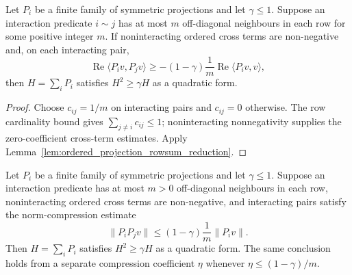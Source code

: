 \begin{lemma}
    \label{lem:finite_overlap_projection_rowsum_reduction}
    \leanok
    Let $P_i$ be a finite family of symmetric projections and let $\gamma\le1$.
    Suppose an interaction predicate $i\sim j$ has at most $m$ off-diagonal
    neighbours in each row for some positive integer $m$. If noninteracting
    ordered cross terms are non-negative and, on each interacting pair,
    \[
        \operatorname{Re}\langle P_i v,P_jv\rangle
        \ge -(1-\gamma)\frac{1}{m}\operatorname{Re}\langle P_i v,v\rangle,
    \]
    then $H=\sum_i P_i$ satisfies $H^2\ge \gamma H$ as a quadratic form.
\end{lemma}

\begin{proof}
    \leanok
    Choose $c_{ij}=1/m$ on interacting pairs and $c_{ij}=0$ otherwise. The row
    cardinality bound gives $\sum_{j\ne i}c_{ij}\le1$; noninteracting
    nonnegativity supplies the zero-coefficient cross-term estimates. Apply
    Lemma~\ref{lem:ordered_projection_rowsum_reduction}.
\end{proof}

\begin{lemma}
    \label{lem:finite_overlap_projection_norm_reduction}
    \leanok
    Let $P_i$ be a finite family of symmetric projections and let $\gamma\le1$.
    Suppose an interaction predicate has at most $m>0$ off-diagonal neighbours
    in each row, noninteracting ordered cross terms are non-negative, and
    interacting pairs satisfy the norm-compression estimate
    \begin{equation}\label{eq:ph_finite_overlap_norm_compression}
        \|P_iP_jv\|\le (1-\gamma)\frac{1}{m}\|P_iv\|.
    \end{equation}
    Then $H=\sum_iP_i$ satisfies $H^2\ge\gamma H$ as a quadratic form. The same
    conclusion holds from a separate compression coefficient $\eta$ whenever
    $\eta\le (1-\gamma)/m$.
\end{lemma}

